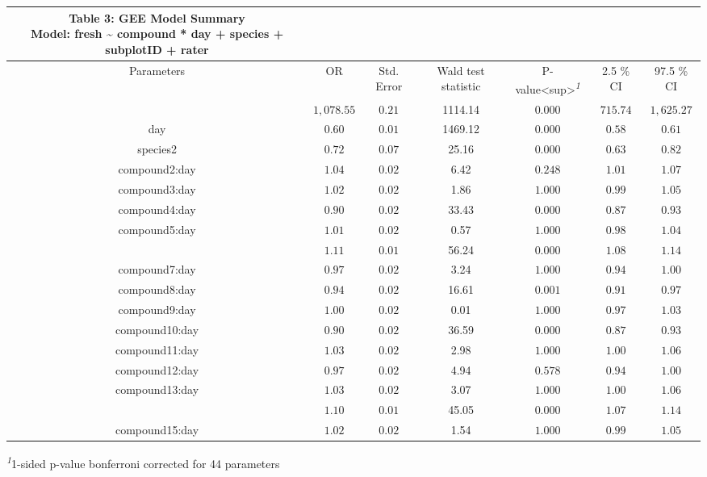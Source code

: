 \setlength{\LTpost}{0mm}
\begin{longtable}{ccccccc}
\caption*{
{\large Table 3: GEE Model Summary} \\ 
{\small Model: fresh \textasciitilde{} compound * day + species + subplotID + rater}
} \\ 
\toprule
Parameters & OR & Std. Error & Wald test statistic & P-value<sup>\textsuperscript{\textit{1}} & 2.5 \% CI & 97.5 \% CI \\ 
\midrule\addlinespace[2.5pt]
\cellcolor[HTML]{ADD8E6}{(Intercept)} & $1,078.55$ & $0.21$ & 1114.14 & $0.000$ & $715.74$ & $1,625.27$ \\ 
day & $0.60$ & $0.01$ & 1469.12 & $0.000$ & $0.58$ & $0.61$ \\ 
species2 & $0.72$ & $0.07$ & 25.16 & $0.000$ & $0.63$ & $0.82$ \\ 
compound2:day & $1.04$ & $0.02$ & 6.42 & $0.248$ & $1.01$ & $1.07$ \\ 
compound3:day & $1.02$ & $0.02$ & 1.86 & $1.000$ & $0.99$ & $1.05$ \\ 
compound4:day & $0.90$ & $0.02$ & 33.43 & $0.000$ & $0.87$ & $0.93$ \\ 
compound5:day & $1.01$ & $0.02$ & 0.57 & $1.000$ & $0.98$ & $1.04$ \\ 
\cellcolor[HTML]{ADD8E6}{compound6:day} & $1.11$ & $0.01$ & 56.24 & $0.000$ & $1.08$ & $1.14$ \\ 
compound7:day & $0.97$ & $0.02$ & 3.24 & $1.000$ & $0.94$ & $1.00$ \\ 
compound8:day & $0.94$ & $0.02$ & 16.61 & $0.001$ & $0.91$ & $0.97$ \\ 
compound9:day & $1.00$ & $0.02$ & 0.01 & $1.000$ & $0.97$ & $1.03$ \\ 
compound10:day & $0.90$ & $0.02$ & 36.59 & $0.000$ & $0.87$ & $0.93$ \\ 
compound11:day & $1.03$ & $0.02$ & 2.98 & $1.000$ & $1.00$ & $1.06$ \\ 
compound12:day & $0.97$ & $0.02$ & 4.94 & $0.578$ & $0.94$ & $1.00$ \\ 
compound13:day & $1.03$ & $0.02$ & 3.07 & $1.000$ & $1.00$ & $1.06$ \\ 
\cellcolor[HTML]{ADD8E6}{compound14:day} & $1.10$ & $0.01$ & 45.05 & $0.000$ & $1.07$ & $1.14$ \\ 
compound15:day & $1.02$ & $0.02$ & 1.54 & $1.000$ & $0.99$ & $1.05$ \\ 
\bottomrule
\end{longtable}
\begin{minipage}{\linewidth}
\textsuperscript{\textit{1}}1-sided p-value bonferroni corrected for 44 parameters\\
\end{minipage}

